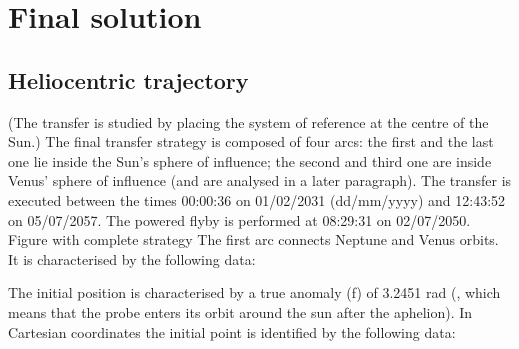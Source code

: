 \documentclass[11pt,a4paper]{report}
\begin{document}
\section{Final solution}

\subsection{Heliocentric trajectory}
(The transfer is studied by placing the system of reference at the centre of the Sun.)
The final transfer strategy is composed of four arcs: the first and the last one lie inside the Sun’s sphere of influence; the second and third one are inside Venus’ sphere of influence (and are analysed in a later paragraph). The transfer is executed between the times 00:00:36 on 01/02/2031 (dd/mm/yyyy) and 12:43:52 on 05/07/2057. The powered flyby is performed at 08:29:31 on 02/07/2050.
Figure with complete strategy
The first arc connects Neptune and Venus orbits. It is characterised by the following data:

\begin{table}[H]
\centering
{}
\end{table}

The initial position is characterised by a true anomaly (f) of 3.2451 rad (, which means that the probe enters its orbit around the sun after the aphelion). In Cartesian coordinates the initial point is identified by the following data:

\begin{table}[H]
\centering
{}
\end{table}
\end{document}
